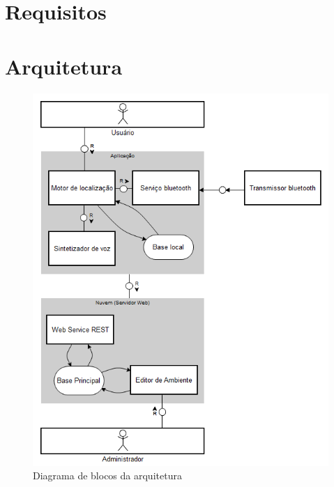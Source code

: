 \documentclass[english,brazilian]{UNISINOSmonografia}
\begin{document}
	\section{Requisitos}

	\section{Arquitetura}
 

\FloatBarrier 
\begin{figure}[!ht]
	\caption{Diagrama de blocos da arquitetura}
	\label{fig:arquitetura}
	\centering%
	\begin{minipage}{.8\textwidth}
		\includegraphics[width=\textwidth]{imgs/arquitetura.png}
	\end{minipage}
\end{figure}
\FloatBarrier 




\end{document}
